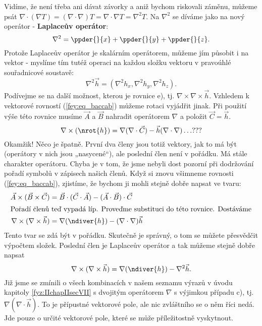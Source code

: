       Vidíme, že není třeba ani dávat závorky a aniž bychom riskovali záměnu, můžeme psát \(\nabla 
      \cdot(\nabla T) = (\nabla\cdot\nabla)T = \nabla\cdot\nabla T = \nabla^2T\). Na \(\nabla^2\) se 
      díváme jako na nový operátor - \textbf{Laplaceův operátor}:
      \begin{equation}\label{fyz:eq687}
        \nabla^2 = \ppder{}{x} + \ppder{}{y} + \ppder{}{z}.
      \end{equation}
      Protože Laplaceův operátor je skalárním operátorem, můžeme jím působit i na vektor - myslíme 
      tím tutéž operaci na každou složku vektoru v pravoúhlé souřadnicové soustavě:
      \begin{equation*}
        \nabla^2\vec{h} = (\nabla^2h_x, \nabla^2h_y, \nabla^2h_z).
      \end{equation*}
      Podívejme se na další možnost, kterou je rovnice e), tj. \(\nabla\times\nabla\times\vec{h}\). 
      Vzhledem k vektorové rovností (\ref{fey:eq_baccab}) můžeme rotaci vyjádřit jinak. Při použití 
      výše této rovnice 
      musíme \(\vec{A}\) a \(\vec{B}\) nahradit operátorem \(\nabla\) a položit \(\vec{C} = \vec{h}\).
      \begin{equation*}
        \nabla\times(\nrot{h}) = \nabla(\nabla\cdot\vec{C}) - \vec{h}(\nabla\cdot\nabla) \ldots ???
      \end{equation*}
      Okamžik! Něco je špatně. První dva členy jsou totiž vektory, jak to má být (operátory v nich 
      jsou „nasycené“), ale poslední člen není v pořádku. Má stále charakter operátoru. Chyba je v 
      tom, že jsme nebyli dost pozorní při dodržování pořadí symbolů v zápisech našich členů. Když si 
      znovu všimneme rovnosti (\ref{fey:eq_baccab}), zjistíme, že bychom ji mohli stejně dobře napsat 
      ve tvaru:
      \begin{align*}
        \vec{A}\times(\vec{B}\times\vec{C}) 
          &= \vec{B}\cdot(\vec{C}\cdot\vec{A}) - (\vec{A}\cdot\vec{B})\cdot\vec{C}  \\
        \shortintertext{Pořadí členů teď vypadá líp. Proveďme substituci do této rovnice. Dostáváme} 
        \nabla\times(\nabla\times\vec{h})
          &= \nabla(\ndiver{h}) - (\nabla\cdot\nabla)\vec{h} 
      \end{align*}
      Tento tvar se zdá být v pořádku. Skutečně je správný, o tom se můžete přesvědčit výpočtem 
      složek. Poslední člen je Laplaceův operátor a tak můžeme stejně dobře napsat
      \begin{equation*}
        \nabla\times(\nabla\times\vec{h}) = \nabla(\ndiver{h}) - \nabla^2\vec{h}.
      \end{equation*}
      Již jsme se zmínili o všech kombinacích v našem seznamu výrazů v úvodu kapitoly  
      \ref{fyz:IIchapIIsecVII} s dvojitým operátorem \(\nabla\) s výjimkou případu c), 
      tj.\(\nabla(\nabla\cdot\vec{h})\). To je přípustné vektorové pole, ale nic zvláštního se o něm 
      říci nedá. Jde pouze o určité vektorové pole, které se může příležitostně vyskytnout.
  
